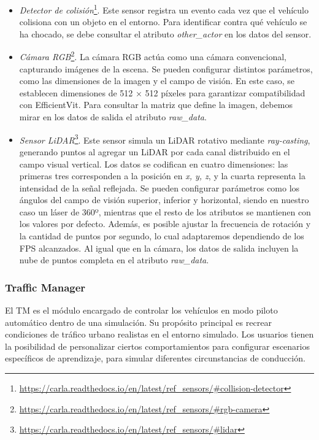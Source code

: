 \begin{itemize}
\item \textit{Detector de colisión}\footnote{\url{https://carla.readthedocs.io/en/latest/ref_sensors/\#collision-detector}}. Este sensor registra un evento cada vez que el vehículo colisiona con un objeto en el entorno. Para identificar contra qué vehículo se ha chocado, se debe consultar el atributo \textit{other\_actor} en los datos del sensor.

\item \textit{Cámara RGB}\footnote{\url{https://carla.readthedocs.io/en/latest/ref_sensors/\#rgb-camera}}. La cámara RGB actúa como una cámara convencional, capturando imágenes de la escena. Se pueden configurar distintos parámetros, como las dimensiones de la imagen y el campo de visión. En este caso, se establecen dimensiones de 512 × 512 píxeles para garantizar compatibilidad con EfficientVit. Para consultar la matriz que define la imagen, debemos mirar en los datos de salida el atributo \textit{raw\_data}.

\item \textit{Sensor \ac{LiDAR}}\footnote{\url{https://carla.readthedocs.io/en/latest/ref_sensors/\#lidar}}. Este sensor simula un \ac{LiDAR} rotativo mediante \textit{ray-casting}, generando puntos al agregar un \ac{LiDAR} por cada canal distribuido en el campo visual vertical. Los datos se codifican en cuatro dimensiones: las primeras tres corresponden a la posición en \textit{x, y, z}, y la cuarta representa la intensidad de la señal reflejada. Se pueden configurar parámetros como los ángulos del campo de visión superior, inferior y horizontal, siendo en nuestro caso un láser de 360º, mientras que el resto de los atributos se mantienen con los valores por defecto. Además, es posible ajustar la frecuencia de rotación y la cantidad de puntos por segundo, lo cual adaptaremos dependiendo de los \ac{FPS} alcanzados. Al igual que en la cámara, los datos de salida incluyen la nube de puntos completa en el atributo \textit{raw\_data}.
\end{itemize}

\subsubsection{Traffic Manager}

El \ac{TM} es el módulo encargado de controlar los vehículos en modo piloto automático dentro de una simulación. Su propósito principal es recrear condiciones de tráfico urbano realistas en el entorno simulado. Los usuarios tienen la posibilidad de personalizar ciertos comportamientos para configurar escenarios específicos de aprendizaje, para simular diferentes circunstancias de conducción.


